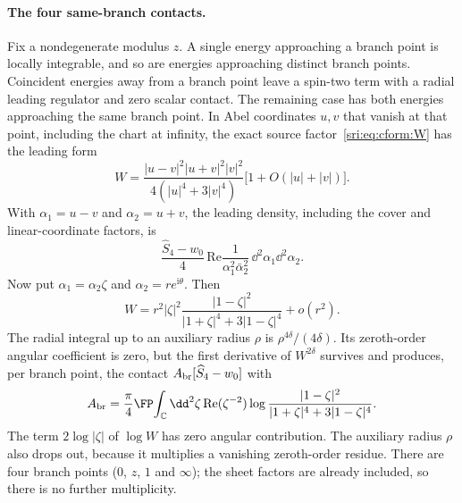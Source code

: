 \paragraph{The four same-branch contacts.} Fix a nondegenerate modulus $z$. A single energy approaching a branch point
is locally integrable, and so are energies approaching distinct branch points. Coincident energies away from a branch
point leave a spin-two term with a radial leading regulator and zero scalar contact. The remaining case has both
energies approaching the same branch point. In Abel coordinates $u,v$ that vanish at that point, including the chart
at infinity, the exact source factor~\eqref{sri:eq:cform:W} has the leading form
\begin{equation}
 W=\frac{|u-v|^2|u+v|^2|v|^2}{4(|u|^4+3|v|^4)}\bigl[1+O(|u|+|v|)\bigr].
 \label{sri:eq:cform:branchW}
\end{equation}
With $\alpha_1=u-v$ and $\alpha_2=u+v$, the leading density, including the cover and linear-coordinate factors, is
\begin{equation}
 \frac{\widehat S_4-w_0}{4}\,\mathrm{Re}\frac1{\alpha_1^2\bar\alpha_2^2}\,\dd^2\alpha_1\dd^2\alpha_2.
\end{equation}
Now put $\alpha_1=\alpha_2\zeta$ and $\alpha_2=re^{\mathrm i\theta}$. Then
\begin{equation}
 W=r^2|\zeta|^2\frac{|1-\zeta|^2}{|1+\zeta|^4+3|1-\zeta|^4}+o(r^2).
\end{equation}
The radial integral up to an auxiliary radius $\rho$ is $\rho^{4\delta}/(4\delta)$. Its zeroth-order angular
coefficient is zero, but the first derivative of $W^{2\delta}$ survives and produces, per branch point, the contact
$A_{\rm br}[\widehat S_4-w_0]$ with
\begin{equation}
 A_{\rm br}=\frac\pi4\FP\!\int_{\mathbb C}\dd^2\zeta\,\mathrm{Re}(\zeta^{-2})
 \log\frac{|1-\zeta|^2}{|1+\zeta|^4+3|1-\zeta|^4}.
 \label{sri:eq:cform:Abr}
\end{equation}
The term $2\log|\zeta|$ of $\log W$ has zero angular contribution. The auxiliary radius $\rho$ also drops out,
because it multiplies a vanishing zeroth-order residue. There are four branch points ($0$, $z$, $1$ and $\infty$); the
sheet factors are already included, so there is no further multiplicity.

